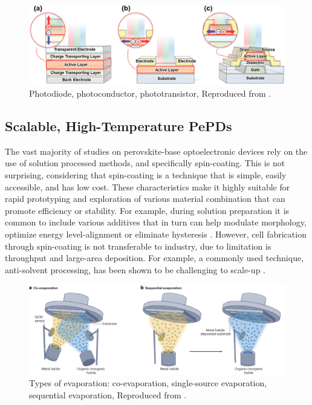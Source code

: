 \begin{figure}[htbp]
  \centering
  \medskip
  \includegraphics[width=.9\textwidth]{chapters/introduction/image/types_of_detector.jpg}
  \caption[Short caption for Table of Figures]{Photodiode, photoconductor, phototransistor, Reproduced from \cite{Yoo2021ADirections}.}
  \label{fig:ch2:types_of_detector}
\end{figure}

\subsection{Scalable, High-Temperature PePDs} \label{ch1:scalable_high_temp}



The vast majority of studies on perovskite-base optoelectronic devices rely on the use of solution processed methods, and specifically spin-coating. This is not surprising, considering that spin-coating is a technique that is simple, easily accessible, and has low cost. These characteristics make it highly suitable for rapid prototyping and exploration of various material combination that can promote efficiency or stability. For example, during solution preparation it is common to include various additives that in turn can help modulate morphology, optimize energy level-alignment or eliminate hysteresis \cite{Liu2020ACells}. However, cell fabrication through spin-coating is not transferable to industry, due to limitation is throughput and large-area deposition. For example, a commonly used technique, anti-solvent processing, has been shown to be challenging to scale-up \cite{Saki2021Solution-processedCells}.

\begin{figure}[htbp]
  \centering
  \medskip
  \includegraphics[width=.99\textwidth]{chapters/introduction/image/types_of_evaporation.png}
  \caption[Short caption for Table of Figures]{Types of evaporation: co-evaporation, single-source evaporation, sequential evaporation, Reproduced from \cite{Han2025PerovskiteCells}.}
  \label{fig:ch2:types_of_evaporation}
\end{figure}

